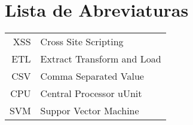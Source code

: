     \newcommand\disablenewpage[1]{{\let\clearpage\par\let\cleardoublepage\par #1}}
    
    \bgroup
    \raggedbottom
    
    
    \disablenewpage{\chapter*{Lista de Abreviaturas}}
    
    \begin{tabular}{rl}
       XSS & Cross Site Scripting\\
       ETL & Extract Transform and Load \\
       CSV & Comma Separated Value \\
       CPU & Central Processor uUnit \\ 
       SVM & Suppor Vector Machine
    \end{tabular}
    
    
